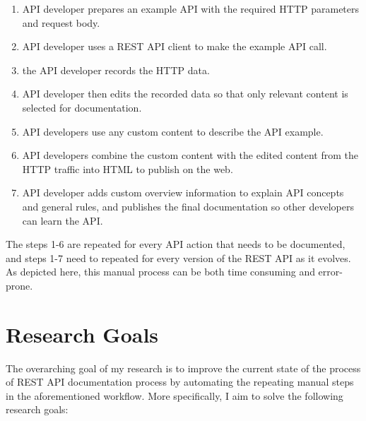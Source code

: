 \begin{enumerate}
  \item API developer prepares an example API with the required HTTP parameters and request body.
  \item API developer uses a REST API client to make the example API call.
  \item the API developer records the HTTP data.
  \item API developer then edits the recorded data so that only relevant content is selected for documentation.
  \item API developers use any custom content to describe the API example.
  \item API developers combine the custom content with the edited content from the HTTP traffic into HTML to publish on the web.
  \item API developer adds custom overview information to explain API concepts and general rules, and publishes the final documentation so other developers can learn the API.
\end{enumerate}

The steps 1-6 are repeated for every API action that needs to be documented, and steps 1-7 need to repeated for every version of the REST API as it evolves. As depicted here, this manual process can be both time consuming and error-prone.

\section{Research Goals}
The overarching goal of my research is to improve the current state of the process of REST API documentation process by automating the repeating manual steps in the aforementioned workflow. More specifically, I aim to solve the following research goals:

